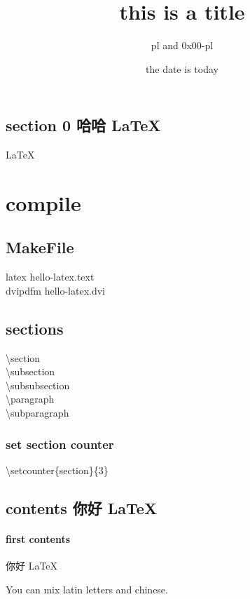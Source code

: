 \documentclass[11pt,a4paper]{article}
\begin{document}
\title{this is a title}
\author{pl and 0x00-pl}  %
\date{the date is today}  %
\maketitle

\begin{CJK}{UTF8}{gbsn}
\tableofcontents
\end{CJK}


\begin{CJK}{UTF8}{gbsn}
  \section{section 0 哈哈 \LaTeX}{
    \LaTeX
  }
\end{CJK}

\section{compile}{
  \subsection{MakeFile}{
    latex hello-latex.text\\
    dvipdfm hello-latex.dvi
  }
  \subsection{sections}
  \textbackslash{}section\\
  \textbackslash{}subsection\\
  \textbackslash{}subsubsection\\
  \textbackslash{}paragraph\\
  \textbackslash{}subparagraph

  \subsubsection{set section counter}
  \textbackslash{}setcounter\{section\}\{3\}
}

\begin{CJK}{UTF8}{gbsn}
  \section{contents 你好 \LaTeX}{
    \linespread{1.3} %
    \paragraph{first contents}
    你好 \LaTeX
    
    You can mix latin letters and chinese.
  }
\end{CJK}
\end{document}
